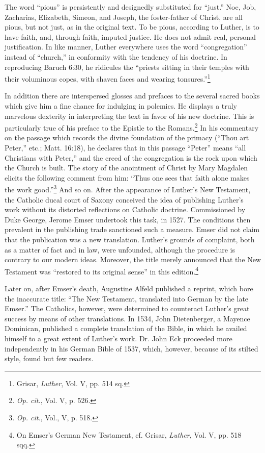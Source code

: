 The word “pious” is persistently and designedly substituted for “just.”
Noe, Job, Zacharias, Elizabeth, Simeon, and Joseph, the foster-father of
Christ, are all pious, but not just, as in the original text. To be pious,
according to Luther, is to have faith, and, through faith, imputed justice. He
does not admit real, personal justification. In like manner, Luther everywhere
uses the word “congregation” instead of “church,” in conformity
with the tendency of his doctrine. In reproducing Baruch 6:30, he ridicules
the “priests sitting in their temples with their voluminous copes, with shaven
faces and wearing tonsures.”\footnote{Grisar, \textit{Luther}, Vol. V, pp. 514 sq.}

In addition there are interspersed glosses and prefaces to the several
sacred books which give him a fine chance for indulging in polemics.
He displays a truly marvelous dexterity in interpreting the text in
favor of his new doctrine. This is particularly true of his preface to
the Epistle to the Romans.\footnote{\textit{Op. cit.}, Vol. V, p. 526.}
 In his commentary on the passage which
records the divine foundation of the primacy (“Thou art Peter,” etc.;
Matt. 16:18), he declares that in this passage “Peter” means “all
Christians with Peter,” and the creed of the congregation is the rock
upon which the Church is built. The story of the anointment of
Christ by Mary Magdalen elicits the following comment from him:
“Thus one sees that faith alone makes the work good.”\footnote{\textit{Op. cit.}, Vol., V, p. 518.}
 And so on.
After the appearance of Luther’s New Testament, the Catholic
ducal court of Saxony conceived the idea of publishing Luther’s work
without its distorted reflections on Catholic doctrine. Commissioned
by Duke George, Jerome Emser undertook this task, in 1527. The
conditions then prevalent in the publishing trade sanctioned such a
measure. Emser did not claim that the publication was a new translation.
Luther’s grounds of complaint, both as a matter of fact and
in law, were unfounded, although the procedure is contrary to our
modern ideas. Moreover, the title merely announced that the New
Testament was “restored to its original sense” in this edition.\footnote{On Emser’s German New Testament, cf. Grisar, \textit{Luther}, Vol. V, pp. 518 sqq.}

Later on, after Emser’s death, Augustine Alfeld published a reprint, which
bore the inaccurate title: “The New Testament, translated into German
by the late Emser.” The Catholics, however, were determined to
counteract Luther’s great success by means of other translations. In
1534, John Dietenberger, a Mayence Dominican, published a complete
translation of the Bible, in which he availed himself to a great
extent of Luther’s work. Dr. John Eck proceeded more independently in
his German Bible of 1537, which, however, because of its
stilted style, found but few readers.

